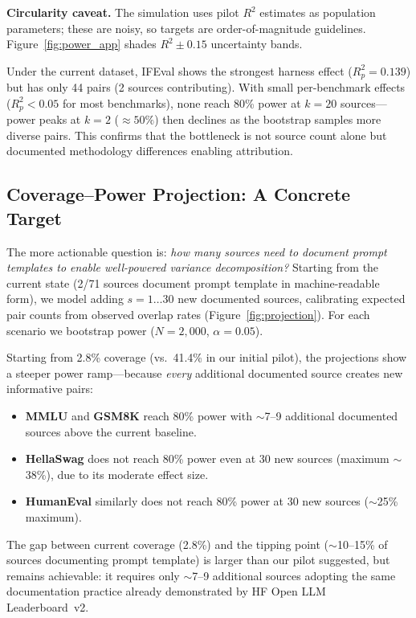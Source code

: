 \documentclass[11pt]{article}
\begin{document}
\textbf{Circularity caveat.}
The simulation uses pilot $R^2$ estimates as population parameters;
these are noisy, so targets are order-of-magnitude guidelines.
Figure~\ref{fig:power_app} shades $R^2 \pm 0.15$ uncertainty bands.

Under the current dataset, IFEval shows the strongest harness effect
($R^2_p = 0.139$) but has only 44 pairs (2 sources contributing).
With small per-benchmark effects ($R^2_p < 0.05$ for most benchmarks),
none reach 80\% power at $k = 20$ sources---power peaks at $k=2$
($\approx 50\%$) then declines as the bootstrap samples more diverse pairs.
This confirms that the bottleneck is not source count alone but
documented methodology differences enabling attribution.

\subsection{Coverage--Power Projection: A Concrete Target}
\label{sec:projection}

The more actionable question is: \emph{how many sources need to document
prompt templates to enable well-powered variance decomposition?}
Starting from the current state (2/71 sources document prompt template
in machine-readable form), we model adding $s = 1\ldots30$ new documented
sources, calibrating expected pair counts from observed overlap rates
(Figure~\ref{fig:projection}).
For each scenario we bootstrap power ($N = 2{,}000$, $\alpha = 0.05$).

Starting from 2.8\% coverage (vs.\ 41.4\% in our initial pilot),
the projections show a steeper power ramp---because \emph{every}
additional documented source creates new informative pairs:
\begin{itemize}
\item \textbf{MMLU} and \textbf{GSM8K} reach 80\% power with
  $\sim$7--9 additional documented sources above the current baseline.
\item \textbf{HellaSwag} does not reach 80\% power even at 30 new
  sources (maximum $\sim$38\%), due to its moderate effect size.
\item \textbf{HumanEval} similarly does not reach 80\% power at 30 new
  sources ($\sim$25\% maximum).
\end{itemize}

The gap between current coverage (2.8\%) and the tipping point
($\sim$10--15\% of sources documenting prompt template) is larger
than our pilot suggested, but remains achievable: it requires only
$\sim$7--9 additional sources adopting the same documentation practice
already demonstrated by HF Open LLM Leaderboard~v2.
\end{document}
